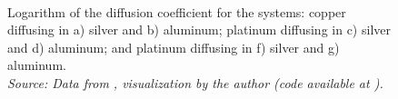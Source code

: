 \begin{figure}[H]
   \\
 \caption{Logarithm of the diffusion coefficient for the systems: copper diffusing in a) silver and b) aluminum; platinum diffusing in c) silver and d) aluminum; and platinum diffusing in f) silver and g) aluminum.\\ 
 \textit{Source: Data from \citep{kakusan}, visualization by the author (code available at \cite{mygit}).}}
 \label{fig:diff_lnd}
\end{figure}
